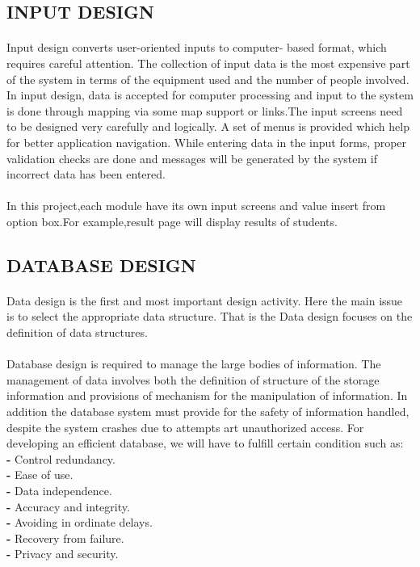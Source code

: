 \documentclass[a4paper, 12pt]{report}
\begin{document}
\subsection{INPUT DESIGN}
\paragraph{}
Input design converts user-oriented inputs to computer- based format, which requires careful attention. The collection of input data is the most expensive part of the system in terms of the equipment used and the number of people involved. In input design, data is accepted for computer processing and input to the system is done through mapping via some map support or links.The input screens need to be designed very carefully and logically. A set of menus is provided which help for better application navigation. While entering data in the input forms, proper validation checks are done and messages will be generated by the system if incorrect data has been entered.
\paragraph{}
In this project,each module have its own input screens and value insert from option box.For example,result page will display results of students.
\subsection{DATABASE DESIGN}
\paragraph{}
Data design is the first and most important design activity. Here the main issue is to select the appropriate data structure. That is the Data design focuses on the definition of data structures.
\paragraph{}
Database design is required to manage the large bodies of information. The management of data involves both the definition of structure of the storage information and provisions of mechanism for the manipulation of information. In addition the database system must provide for the safety of information handled, despite the system crashes due to attempts art unauthorized access. For developing an efficient database, we will have to fulfill certain condition such as:\\
\fontsize{12pt}{12pt}\selectfont
\textbf{- }Control redundancy.\\
\textbf{- }Ease of use.\\
\textbf {- }Data independence.\\
\textbf{- }Accuracy and integrity.\\
\textbf{- }Avoiding in ordinate delays.\\
\textbf{- }Recovery from failure.\\
\textbf{- }Privacy and security.\\
\end{document}

